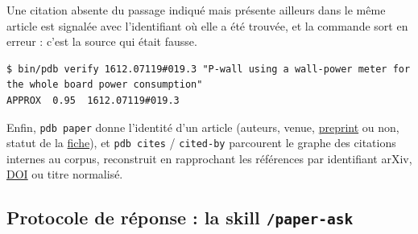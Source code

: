 \documentclass[11pt,a4paper]{article}
\newcommand{\cmd}[1]{\texttt{#1}}
\newcommand{\gl}[2]{\hyperlink{gl:#1}{\textcolor{glcolor}{#2}}}
\begin{document}
Une citation absente du passage indiqué mais présente ailleurs dans le même article est
signalée avec l'identifiant où elle a été trouvée, et la commande sort en erreur : c'est la
source qui était fausse.

\begin{lstlisting}
$ bin/pdb verify 1612.07119#019.3 "P-wall using a wall-power meter for the whole board power consumption"
APPROX  0.95  1612.07119#019.3
\end{lstlisting}

Enfin, \cmd{pdb paper} donne l'identité d'un article (auteurs, venue, \gl{preprint}{preprint} ou non,
statut de la \gl{fiche}{fiche}), et \cmd{pdb cites} / \cmd{cited-by} parcourent le graphe des citations
internes au corpus, reconstruit en rapprochant les références par identifiant arXiv, \gl{DOI}{DOI} ou
titre normalisé.

\subsection{Protocole de réponse : la skill \cmd{/paper-ask}}
\label{sec:paperask}
\end{document}
